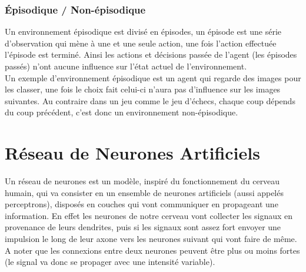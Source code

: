 \documentclass{article}
\begin{document}
\subsubsection{Épisodique / Non-épisodique}

Un environnement épisodique est divisé en épisodes, un épisode est une série d'observation qui mène à une et une seule action, une fois l'action effectuée l'épisode est terminé. Ainsi les actions et décisions passée de l'agent (les épisodes passés) n'ont aucune influence sur l'état actuel de l'environnement.\\
Un exemple d'environnement épisodique est un agent qui regarde des images pour les classer, une fois le choix fait celui-ci n'aura pas d'influence sur les images suivantes. Au contraire dans un jeu comme le jeu d'échecs, chaque coup dépends du coup précédent, c'est donc un environnement non-épisodique.

\newpage
\section{Réseau de Neurones Artificiels}

Un réseau de neurones est un modèle, inspiré du fonctionnement du cerveau humain, qui va consister en un ensemble de neurones artificiels (aussi appelés perceptrons), disposés en couches qui vont communiquer en propageant une information.\cite{wikiann} En effet les neurones de notre cerveau vont collecter les signaux en provenance de leurs dendrites, puis si les signaux sont assez fort envoyer une impulsion le long de leur axone vers les neurones suivant qui vont faire de même. A noter que les connexions entre deux neurones peuvent être plus ou moins fortes (le signal va donc se propager avec une intensité variable).\cite{neuronswork}
\end{document}
